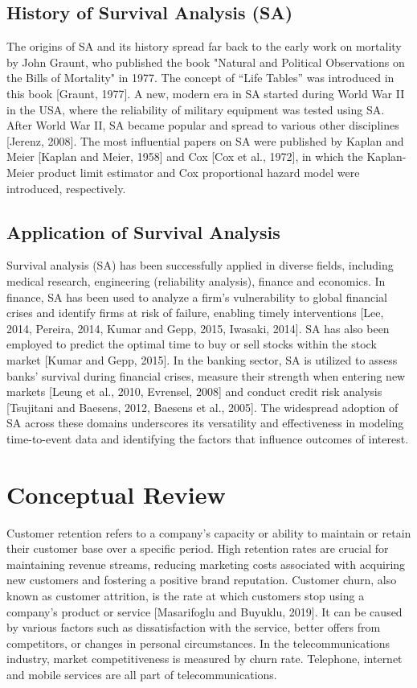 \documentclass[doublespacing,12pt]{report}
\begin{document}
\subsection{History of Survival Analysis (SA)}
The origins of SA and its history spread far back to the early work on mortality by John Graunt, who published the book "Natural and Political Observations on the Bills of Mortality" in 1977. The concept of “Life Tables” was introduced in this book [Graunt, 1977]. A new, modern era in SA started during World War II in the USA, where the reliability of military equipment was tested using SA. After World War II, SA became popular and spread to various other disciplines [Jerenz, 2008]. The most influential papers on SA were published by Kaplan and Meier [Kaplan and Meier, 1958] and Cox [Cox et al., 1972], in which the Kaplan-Meier product limit estimator and Cox proportional hazard model were introduced, respectively.

\subsection{Application of Survival Analysis}
Survival analysis (SA) has been successfully applied in diverse fields, including medical research, engineering (reliability analysis), finance and economics. In finance, SA has been used to analyze a firm's vulnerability to global financial crises and identify firms at risk of failure, enabling timely interventions [Lee, 2014, Pereira, 2014, Kumar and Gepp, 2015, Iwasaki, 2014]. SA has also been employed to predict the optimal time to buy or sell stocks within the stock market [Kumar and Gepp, 2015]. In the banking sector, SA is utilized to assess banks' survival during financial crises, measure their strength when entering new markets [Leung et al., 2010, Evrensel, 2008] and conduct credit risk analysis [Tsujitani and Baesens, 2012, Baesens et al., 2005]. The widespread adoption of SA across these domains underscores its versatility and effectiveness in modeling time-to-event data and identifying the factors that influence outcomes of interest.

\section{Conceptual Review}

Customer retention refers to a company's capacity or ability to maintain or retain their customer base over a specific period. High retention rates are crucial for maintaining revenue streams, reducing marketing costs associated with acquiring new customers and fostering a positive brand reputation. Customer churn, also known as customer attrition, is the rate at which customers stop using a company's product or service [Masarifoglu and Buyuklu, 2019]. It can be caused by various factors such as dissatisfaction with the service, better offers from competitors, or changes in personal circumstances. In the telecommunications industry, market competitiveness is measured by churn rate. Telephone, internet and mobile services are all part of telecommunications.
\end{document}
